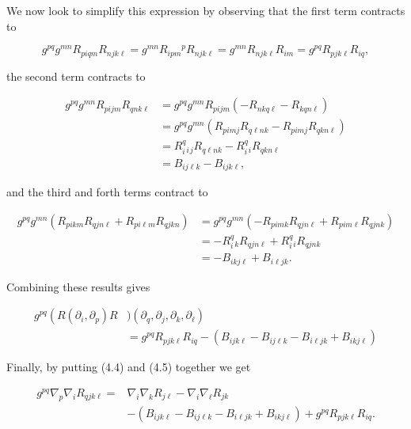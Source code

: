 \documentclass[10pt, letterpaper]{article}
\begin{document}
We now look to simplify this expression by observing that the first term contracts to

$$
g^{p q} g^{m n} R_{p i q m} R_{n j k \ell}=g^{m n} R_{i p m}{ }^{p} R_{n j k \ell}=g^{m n} R_{n j k \ell} R_{i m}=g^{p q} R_{p j k \ell} R_{i q},
$$

the second term contracts to

$$
\begin{aligned}
g^{p q} g^{m n} R_{p i j m} R_{q n k \ell} & =g^{p q} g^{m n} R_{p i j m}\left(-R_{n k q \ell}-R_{k q n \ell}\right) \\
& =g^{p q} g^{m n}\left(R_{p i m j} R_{q \ell n k}-R_{p i m j} R_{q k n \ell}\right) \\
& =R_{i}^{q}{ }_{i}{ }_{j} R_{q \ell n k}-R_{i}^{q}{ }_{i} R_{q k n \ell} \\
& =B_{i j \ell k}-B_{i j k \ell},
\end{aligned}
$$

and the third and forth terms contract to

$$
\begin{aligned}
g^{p q} g^{m n}\left(R_{p i k m} R_{q j n \ell}+R_{p i \ell m} R_{q j k n}\right) & =g^{p q} g^{m n}\left(-R_{p i m k} R_{q j n \ell}+R_{p i m \ell} R_{q j n k}\right) \\
& =-R_{i}^{q}{ }_{k} R_{q j n \ell}+R_{i}^{q}{ }_{i} R_{q j n k} \\
& =-B_{i k j \ell}+B_{i \ell j k} .
\end{aligned}
$$

Combining these results gives

$$
\begin{aligned}
g^{p q}\left(R\left(\partial_{i}, \partial_{p}\right) R\right. & )\left(\partial_{q}, \partial_{j}, \partial_{k}, \partial_{\ell}\right) \\
& =g^{p q} R_{p j k \ell} R_{i q}-\left(B_{i j k \ell}-B_{i j \ell k}-B_{i \ell j k}+B_{i k j \ell}\right)
\end{aligned}
$$

Finally, by putting (4.4) and (4.5) together we get

$$
\begin{aligned}
g^{p q} \nabla_{p} \nabla_{i} R_{q j k \ell}= & \nabla_{i} \nabla_{k} R_{j \ell}-\nabla_{i} \nabla_{\ell} R_{j k} \\
& -\left(B_{i j k \ell}-B_{i j \ell k}-B_{i \ell j k}+B_{i k j \ell}\right)+g^{p q} R_{p j k \ell} R_{i q} .
\end{aligned}
$$
\end{document}
